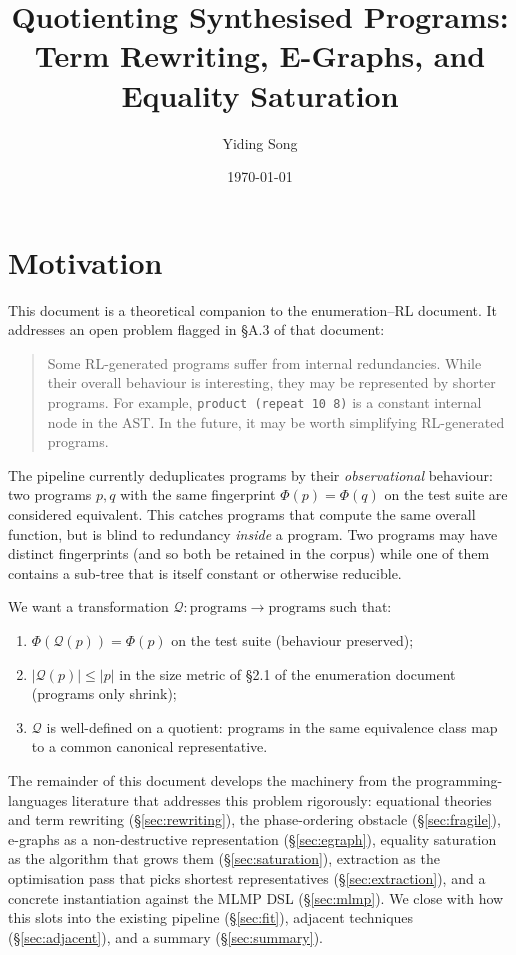 \documentclass[11pt,a4paper]{article}
\title{Quotienting Synthesised Programs:\\Term Rewriting, E-Graphs, and Equality Saturation}
\author{Yiding Song}
\date{\today}
\begin{document}
\maketitle

\section*{Motivation}

This document is a theoretical companion to the enumeration--RL document. It addresses an open problem flagged in §A.3 of that document:

\begin{quote}
Some RL-generated programs suffer from internal redundancies. While their overall behaviour is interesting, they may be represented by shorter programs. For example, \texttt{product (repeat 10 8)} is a constant internal node in the AST. In the future, it may be worth simplifying RL-generated programs.
\end{quote}

The pipeline currently deduplicates programs by their \emph{observational} behaviour: two programs $p, q$ with the same fingerprint $\Phi(p) = \Phi(q)$ on the test suite are considered equivalent. This catches programs that compute the same overall function, but is blind to redundancy \emph{inside} a program. Two programs may have distinct fingerprints (and so both be retained in the corpus) while one of them contains a sub-tree that is itself constant or otherwise reducible.

We want a transformation $\mathcal{Q}: \mathrm{programs} \to \mathrm{programs}$ such that:
\begin{enumerate}
\item $\Phi(\mathcal{Q}(p)) = \Phi(p)$ on the test suite (behaviour preserved);
\item $|\mathcal{Q}(p)| \le |p|$ in the size metric of §2.1 of the enumeration document (programs only shrink);
\item $\mathcal{Q}$ is well-defined on a quotient: programs in the same equivalence class map to a common canonical representative.
\end{enumerate}

The remainder of this document develops the machinery from the programming-languages literature that addresses this problem rigorously: equational theories and term rewriting (§\ref{sec:rewriting}), the phase-ordering obstacle (§\ref{sec:fragile}), e-graphs as a non-destructive representation (§\ref{sec:egraph}), equality saturation as the algorithm that grows them (§\ref{sec:saturation}), extraction as the optimisation pass that picks shortest representatives (§\ref{sec:extraction}), and a concrete instantiation against the MLMP DSL (§\ref{sec:mlmp}). We close with how this slots into the existing pipeline (§\ref{sec:fit}), adjacent techniques (§\ref{sec:adjacent}), and a summary (§\ref{sec:summary}).
\end{document}
